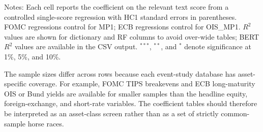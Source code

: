 \begin{table}[H]
\centering
\caption{Additional RQ1 outcomes: ECB press conferences}
\label{tab:a2_broad_ecb_press_conferences}
\begin{threeparttable}
\scriptsize
{}
\begin{tablenotes}
\footnotesize
\item Notes: Each cell reports the coefficient on the relevant text score from a controlled single-score regression with HC1 standard errors in parentheses. FOMC regressions control for MP1; ECB regressions control for OIS\_MP1. $R^2$ values are shown for dictionary and RF columns to avoid over-wide tables; BERT $R^2$ values are available in the CSV output. $^{***}$, $^{**}$, and $^{*}$ denote significance at 1\%, 5\%, and 10\%.
\end{tablenotes}
\end{threeparttable}
\end{table}

The sample sizes differ across rows because each event-study database has
asset-specific coverage. For example, FOMC TIPS breakevens and ECB long-maturity
OIS or Bund yields are available for smaller samples than the headline equity,
foreign-exchange, and short-rate variables. The coefficient tables should
therefore be interpreted as an asset-class screen rather than as a set of
strictly common-sample horse races.



